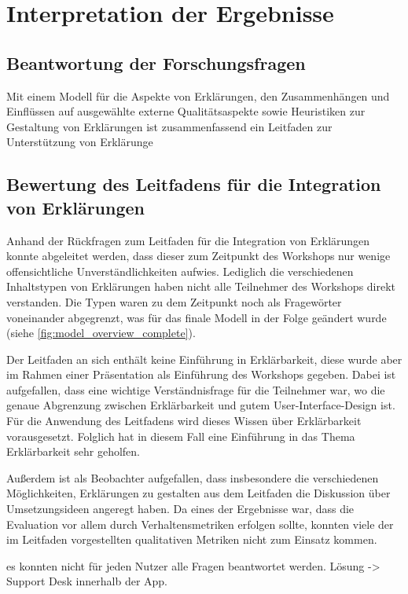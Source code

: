\section{Interpretation der Ergebnisse}

\subsection*{Beantwortung der Forschungsfragen}

Mit einem Modell für die Aspekte von Erklärungen, den Zusammenhängen und Einflüssen auf ausgewählte externe Qualitätsaspekte sowie Heuristiken zur Gestaltung von Erklärungen ist zusammenfassend ein Leitfaden zur Unterstützung von Erklärunge

\subsection*{Bewertung des Leitfadens für die Integration von Erklärungen}

Anhand der Rückfragen zum Leitfaden für die Integration von Erklärungen konnte abgeleitet werden, dass dieser zum Zeitpunkt des Workshops nur wenige offensichtliche Unverständlichkeiten aufwies. Lediglich die verschiedenen Inhaltstypen von Erklärungen haben nicht alle Teilnehmer des Workshops direkt verstanden. Die Typen waren zu dem Zeitpunkt noch als Fragewörter voneinander abgegrenzt, was für das finale Modell in der Folge geändert wurde (siehe \autoref{fig:model_overview_complete}).

Der Leitfaden an sich enthält keine Einführung in Erklärbarkeit, diese wurde aber im Rahmen einer Präsentation als Einführung des Workshops gegeben. Dabei ist aufgefallen, dass eine wichtige Verständnisfrage für die Teilnehmer war, wo die genaue Abgrenzung zwischen Erklärbarkeit und gutem User-Interface-Design ist. Für die Anwendung des Leitfadens wird dieses Wissen über Erklärbarkeit vorausgesetzt. Folglich hat in diesem Fall eine Einführung in das Thema Erklärbarkeit sehr geholfen.

Außerdem ist als Beobachter aufgefallen, dass insbesondere die verschiedenen Möglichkeiten, Erklärungen zu gestalten aus dem Leitfaden die Diskussion über Umsetzungsideen angeregt haben. Da eines der Ergebnisse war, dass die Evaluation vor allem durch Verhaltensmetriken erfolgen sollte, konnten viele der im Leitfaden vorgestellten qualitativen Metriken nicht zum Einsatz kommen.

es konnten nicht für jeden Nutzer alle Fragen beantwortet werden. Lösung -> Support Desk innerhalb der App.